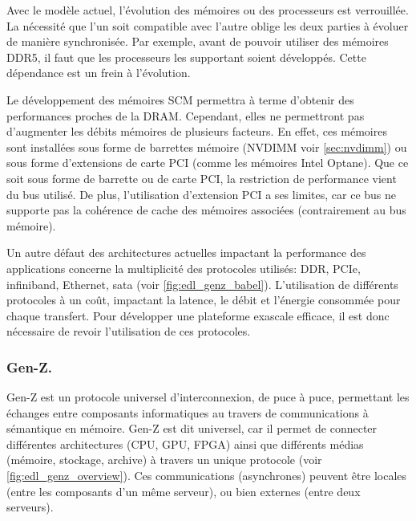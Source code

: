         Avec le modèle actuel, l'évolution des mémoires ou des processeurs est verrouillée. La nécessité que l'un soit compatible avec l'autre oblige les deux parties à évoluer de manière synchronisée. Par exemple, avant de pouvoir utiliser des mémoires DDR5, il faut que les processeurs les supportant soient développés. Cette dépendance est un frein à l'évolution.
        
        Le développement des mémoires SCM permettra à terme d'obtenir des performances proches de la DRAM. Cependant, elles ne permettront pas d'augmenter les débits mémoires de plusieurs facteurs. En effet, ces mémoires sont installées sous forme de barrettes mémoire (NVDIMM voir \autoref{sec:nvdimm}) ou sous forme d'extensions de carte PCI (comme les mémoires Intel Optane). Que ce soit sous forme de barrette ou de carte PCI, la restriction de performance vient du bus utilisé. De plus, l'utilisation d'extension PCI a ses limites, car ce bus ne supporte pas la cohérence de cache des mémoires associées (contrairement au bus mémoire).

        Un autre défaut des architectures actuelles impactant la performance des applications concerne la multiplicité des protocoles utilisés: DDR, PCIe, infiniband, Ethernet, sata (voir \autoref{fig:edl_genz_babel}). L'utilisation de différents protocoles à un coût, impactant la latence, le débit et l'énergie consommée pour chaque transfert. Pour développer une plateforme exascale efficace, il est donc nécessaire de revoir l'utilisation de ces protocoles.
            
           
        
   
    
    \subsubsection{Gen-Z.}
        
        Gen-Z est un protocole universel d'interconnexion, de puce à puce, permettant les échanges entre composants informatiques au travers de communications à sémantique en mémoire. Gen-Z est dit universel, car il permet de connecter différentes architectures (CPU, GPU, FPGA) ainsi que différents médias (mémoire, stockage, archive) à travers un unique protocole (voir \autoref{fig:edl_genz_overview}). Ces communications (asynchrones) peuvent être locales (entre les composants d'un même serveur), ou bien externes (entre deux serveurs). 


